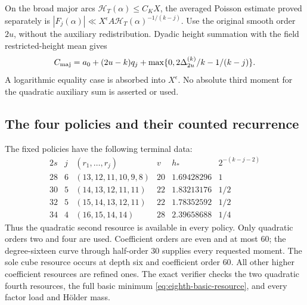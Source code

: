 \documentclass[11pt,reqno]{amsart}
\numberwithin{equation}{section}
\theoremstyle{definition}
\begin{document}
On the broad major arcs $\mathcal H_T(\alpha)\le C_KX$, the averaged
Poisson estimate proved separately is
$|F_j(\alpha)|\ll X^\epsilon A\mathcal H_T(\alpha)^{-1/(k-j)}$.
Use the original smooth order $2u$, without the auxiliary redistribution.
Dyadic height summation with the field restricted-height mean gives
\begin{equation}\label{eq:eighth-major-exponent}
 C_{\rm maj}=a_0+(2u-k)q_j+
               \max\{0,2\Delta_{2u}^{(k)}/k-1/(k-j)\}.
\end{equation}
A logarithmic equality case is absorbed into $X^\epsilon$.
No absolute third moment for the quadratic auxiliary sum is asserted or used.

\subsection{The four policies and their counted recurrence}

The fixed policies have the following terminal data:
\[
\begin{array}{c|c|c|c|c|c}
 2s&j&(r_1,\ldots,r_j)&v&h_*&2^{-(k-j-2)}\\\hline
28&6&(13,12,11,10,9,8)&20&1.69428296&1\\
30&5&(14,13,12,11,11)&22&1.83213176&1/2\\
32&5&(15,14,13,12,11)&22&1.78352592&1/2\\
34&4&(16,15,14,14)&28&2.39658688&1/4
\end{array}
\]
Thus the quadratic second resource is available in every policy.
Only quadratic orders two and four are used. Coefficient orders are even
and at most $60$; the degree-sixteen curve through half-order $30$ supplies
every requested moment. The sole cube resource occurs at depth six and
coefficient order $60$. All other higher coefficient resources are refined
ones. The exact verifier checks the two quadratic fourth resources,
the full basic minimum \eqref{eq:eighth-basic-resource}, and every factor
load and H\"older mass.
\end{document}
